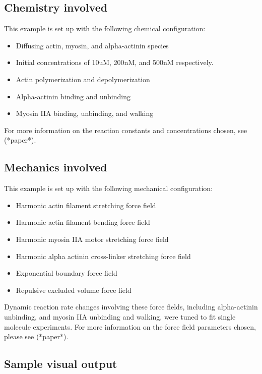 \documentclass[11pt, oneside]{article}   	%
\begin{document}
\subsection{Chemistry involved}

This example is set up with the following chemical configuration:

\begin{itemize}
\item Diffusing actin, myosin, and alpha-actinin species
\item Initial concentrations of 10uM, 200nM, and 500nM respectively.
\item Actin polymerization and depolymerization
\item Alpha-actinin binding and unbinding
\item Myosin IIA binding, unbinding, and walking

\end{itemize}

\noindent For more information on the reaction constants and concentrations chosen, see (*paper*).

\subsection{Mechanics involved}

This example is set up with the following mechanical configuration:

\begin{itemize}
\item Harmonic actin filament stretching force field
\item Harmonic actin filament bending force field
\item Harmonic myosin IIA motor stretching force field
\item Harmonic alpha actinin cross-linker stretching force field
\item Exponential boundary force field
\item Repulsive excluded volume force field
\end{itemize}

\noindent Dynamic reaction rate changes involving these force fields, including alpha-actinin unbinding, and myosin IIA unbinding and walking, were tuned to fit single molecule experiments.\newline\newline
\noindent For more information on the force field parameters chosen, please see (*paper*). 


\subsection{Sample visual output}
\end{document}
